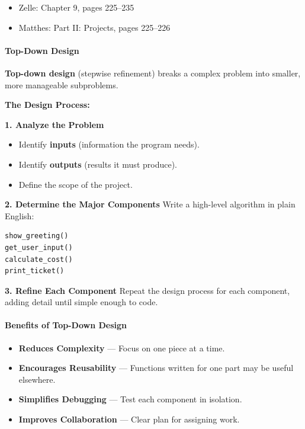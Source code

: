 \documentclass[
  justified,
  openright,
]{tufte-book}
\let\subsection\paragraph
\let\paragraph\paragraph
\let\subsection\paragraph
\let\paragraph\paragraph
\providecommand{\tightlist}{%
  \setlength{\itemsep}{0pt}\setlength{\parskip}{0pt}}
\begin{document}
\begin{itemize}
\tightlist
\item
  Zelle: Chapter 9, pages 225--235
\item
  Matthes: Part II: Projects, pages 225--226
\end{itemize}

\subsection{Top-Down Design}\label{top-down-design}

\textbf{Top-down design} (stepwise refinement) breaks a complex problem
into smaller, more manageable subproblems.

\textbf{The Design Process:}

\textbf{1. Analyze the Problem}

\begin{itemize}
\tightlist
\item
  Identify \textbf{inputs} (information the program needs).
\item
  Identify \textbf{outputs} (results it must produce).
\item
  Define the scope of the project.
\end{itemize}

\textbf{2. Determine the Major Components} Write a high-level algorithm
in plain English:

\begin{verbatim}
show_greeting()
get_user_input()
calculate_cost()
print_ticket()
\end{verbatim}

\textbf{3. Refine Each Component} Repeat the design process for each
component, adding detail until simple enough to code.

\subsection{Benefits of Top-Down
Design}\label{benefits-of-top-down-design}

\begin{itemize}
\tightlist
\item
  \textbf{Reduces Complexity} --- Focus on one piece at a time.
\item
  \textbf{Encourages Reusability} --- Functions written for one part may
  be useful elsewhere.
\item
  \textbf{Simplifies Debugging} --- Test each component in isolation.
\item
  \textbf{Improves Collaboration} --- Clear plan for assigning work.
\end{itemize}
\end{document}
